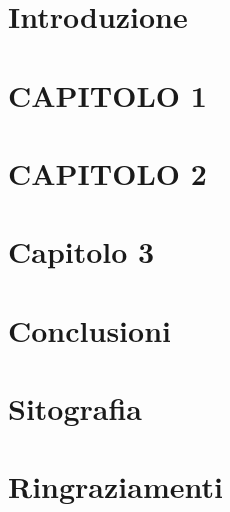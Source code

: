 \documentclass[14pt]{extreport}
\begin{document}

\chapter*{Introduzione}

\setcounter{page}{1} 		


\chapter{CAPITOLO 1}

\chapter{CAPITOLO 2}

\chapter{Capitolo 3}

\chapter*{Conclusioni}

%
%
%
%
\chapter*{Sitografia}

\chapter*{Ringraziamenti}

\end{document}

